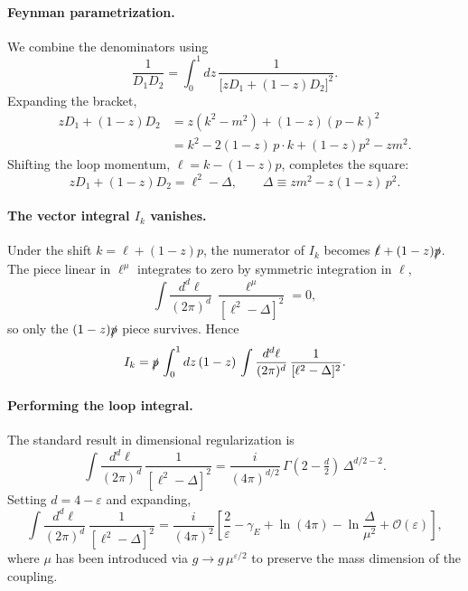 \documentclass[a4paper, 11pt]{article}
\begin{document}
\paragraph{Feynman parametrization.} We combine the denominators using
\begin{equation*}
    \frac{1}{D_1 D_2} = \int_0^1 dz \,\frac{1}{\big[z D_1 + (1-z) D_2\big]^2}.
\end{equation*}
Expanding the bracket,
\begin{align*}
    z D_1 + (1-z) D_2 
    &= z(k^2 - m^2) + (1-z)(p-k)^2 \nonumber\\
    &= k^2 - 2(1-z)\,p\cdot k + (1-z)p^2 - z m^2.
\end{align*}
Shifting the loop momentum, $\ell = k - (1-z)p$, completes the square:
\begin{equation*}
    z D_1 + (1-z) D_2 = \ell^2 - \Delta, \qquad
    \Delta \equiv z m^2 - z(1-z)\,p^2.
\end{equation*}

\paragraph{The vector integral $I_k$ vanishes.} Under the shift $k = \ell + (1-z)p$, the numerator of $I_k$ becomes $\slashed{\ell} + (1-z)\slashed{p}$. The piece linear in $\ell^\mu$ integrates to zero by symmetric integration in $\ell$,
\begin{equation*}
    \int \frac{d^d \ell}{(2\pi)^d}\,\frac{\ell^\mu}{[\ell^2 - \Delta]^2} = 0,
\end{equation*}
so only the $(1-z)\slashed{p}$ piece survives. Hence
\begin{equation*}
    I_k = \slashed{p}\,\int_0^1 dz\,(1-z)\,
    \int \frac{d^d \ell}{(2\pi)^d}\,\frac{1}{[\ell^2 - \Delta]^2}.
\end{equation*}

\paragraph{Performing the loop integral.} The standard result in dimensional regularization is
\begin{equation*}
    \int \frac{d^d \ell}{(2\pi)^d}\,\frac{1}{[\ell^2 - \Delta]^2}
    = \frac{i}{(4\pi)^{d/2}}\,\Gamma\!\left(2 - \tfrac{d}{2}\right)\,\Delta^{d/2 - 2}.
\end{equation*}
Setting $d = 4 - \varepsilon$ and expanding,
\begin{equation*}
    \int \frac{d^d \ell}{(2\pi)^d}\,\frac{1}{[\ell^2 - \Delta]^2}
    = \frac{i}{(4\pi)^2}\left[\frac{2}{\varepsilon} - \gamma_E + \ln(4\pi) - \ln\!\frac{\Delta}{\mu^2} + \mathcal{O}(\varepsilon)\right],
\end{equation*}
where $\mu$ has been introduced via $g \to g\,\mu^{\varepsilon/2}$ to preserve the mass dimension of the coupling.
\end{document}
